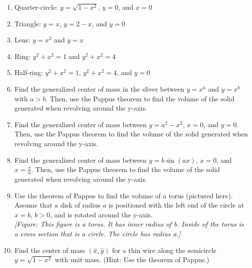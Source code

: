 \documentclass{exercises}
\begin{document}
\begin{enumerate}[resume]
\item \techrequired Quarter-circle: $y=\sqrt{1-x^{2}}$, $y=0$, and $x=0$
\item \techrequired Triangle: $y=x$, $y=2-x$, and $y=0$
\item \techrequired Lens: $y=x^{2}$ and $y=x$
\item \techrequired Ring: $y^{2}+x^{2}=1$ and $y^{2}+x^{2}=4$
\item \techrequired Half-ring: $y^{2}+x^{2}=1$, $y^{2}+x^{2}=4$, and $y=0$
\item Find the generalized center of mass in the sliver between $y=x^{a}$ and $y=x^{b}$ with $a>b$. Then, use the Pappus theorem to find the volume of the solid generated when revolving around the y-axis.
\item Find the generalized center of mass between $y=a^{2}-x^{2}$, $x=0$, and $y=0$. Then, use the Pappus theorem to find the volume of the solid generated when revolving around the y-axis.
\item Find the generalized center of mass between $y=b\sin(ax)$, $x=0$, and $x=\frac{\pi}{a}$. Then, use the Pappus theorem to find the volume of the solid generated when revolving around the y-axis.
\item Use the theorem of Pappus to find the volume of a torus (pictured here). Assume that a disk of radius $a$ is positioned with the left end of the circle at $x=b$, $b>0$, and is rotated around the y-axis. \\ \textit{[Figure: This figure is a torus. It has inner radius of b. Inside of the torus is a cross section that is a circle. The circle has radius a.]}
\item Find the center of mass $(\overset{-}{x},\overset{-}{y})$ for a thin wire along the semicircle $y=\sqrt{1-x^{2}}$ with unit mass. (Hint: Use the theorem of Pappus.)
\end{enumerate}
\end{document}
